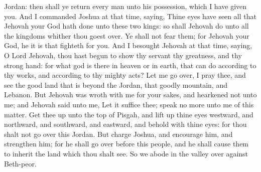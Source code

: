 Jordan: then shall ye return every man unto his possession, which I have given you. And I commanded Joshua at that time, saying, Thine eyes have seen all that Jehovah your God hath done unto these two kings: so shall Jehovah do unto all the kingdoms whither thou goest over. Ye shall not fear them; for Jehovah your God, he it is that fighteth for you.  And I besought Jehovah at that time, saying, O Lord Jehovah, thou hast begun to show thy servant thy greatness, and thy strong hand: for what god is there in heaven or in earth, that can do according to thy works, and according to thy mighty acts? Let me go over, I pray thee, and see the good land that is beyond the Jordan, that goodly mountain, and Lebanon. But Jehovah was wroth with me for your sakes, and hearkened not unto me; and Jehovah said unto me, Let it suffice thee; speak no more unto me of this matter. Get thee up unto the top of Pisgah, and lift up thine eyes westward, and northward, and southward, and eastward, and behold with thine eyes: for thou shalt not go over this Jordan. But charge Joshua, and encourage him, and strengthen him; for he shall go over before this people, and he shall cause them to inherit the land which thou shalt see. So we abode in the valley over against Beth-peor. 


